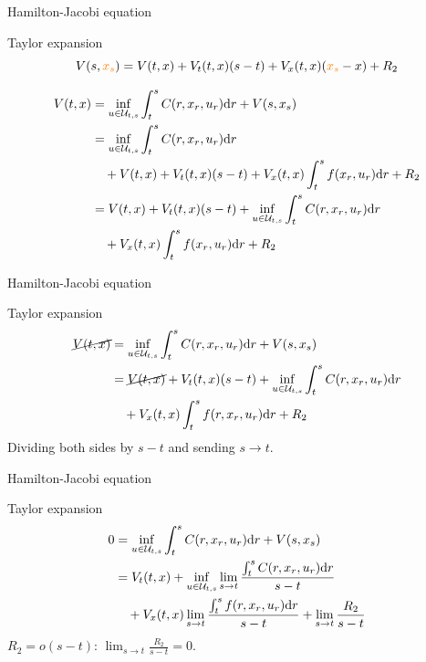 \documentclass[color=usenames,dvipsnames]{beamer}
\newcommand{\dr}{\text{\normalfont d}r}
\begin{document}
\begin{frame}{Hamilton-Jacobi equation}
    \begin{block}
        {Taylor expansion}
        \[
V(s,{\color{orange}{x}_s}) = V(t,x) + V_t(t,x)(s-t) + V_x(t,x)({\color{orange}{x}_s}-x) + R_2
\]

\[
\begin{split}
    V(t,x) & =\inf_{u\in\mathcal{U}_{t,s}}\int_t^sC(r,x_r,u_r){{\dr}}+V(s,x_s)\\
    & = \inf_{u\in\mathcal{U}_{t,s}}\int_t^sC(r,x_r,u_r){{\dr}}\\
    &~~~+V(t,x) + V_t(t,x)(s-t) + V_x(t,x)\int_t^s f(x_r,u_r){{\dr}} + R_2\\
    &= V(t,x) + V_t(t,x)(s-t) +\inf_{u\in\mathcal{U}_{t,s}}\int_t^sC(r,x_r,u_r){{\dr}} \\
    &~~~+ V_x(t,x)\int_t^s f(x_r,u_r){{\dr}} + R_2
\end{split}
\]
    \end{block}
\end{frame}
\begin{frame}{Hamilton-Jacobi equation}
    \begin{block}
        {Taylor expansion}
\[
\begin{split}
    \cancel{V(t,x)} & =\inf_{u\in\mathcal{U}_{t,s}}\int_t^sC(r,x_r,u_r){{\dr}}+V(s,x_s)\\
    &= \cancel{V(t,x)} + V_t(t,x)(s-t) +\inf_{u\in\mathcal{U}_{t,s}}\int_t^sC(r,x_r,u_r){{\dr}} \\
    &~~~+ V_x(t,x)\int_t^s f(r,x_r,u_r){{\dr}} + R_2
\end{split}
\]
Dividing both sides by $s-t$ and sending $s\to t$.
    \end{block}
\end{frame}
\begin{frame}{Hamilton-Jacobi equation}
    \begin{block}
        {Taylor expansion}
\[
\begin{split}
    0 & =\inf_{u\in\mathcal{U}_{t,s}}\int_t^sC(r,x_r,u_r){{\dr}}+V(s,x_s)\\
    &= V_t(t,x) +\inf_{u\in\mathcal{U}_{t,s}}\lim_{s\to t}\frac{\int_t^sC(r,x_r,u_r){{\dr}}}{s-t} \\
    &~~~+ V_x(t,x)\lim_{s\to t}\frac{\int_t^s f(r,x_r,u_r){{\dr}}}{s-t} + \lim_{s\to t} \frac{R_2}{s-t}
\end{split}
\]
$R_2=o(s-t)$: $\lim_{s\to t} \frac{R_2}{s-t}=0$.
    \end{block}
\end{frame}
\end{document}
